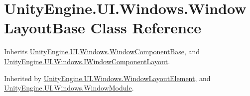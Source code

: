 \hypertarget{class_unity_engine_1_1_u_i_1_1_windows_1_1_window_layout_base}{}\section{Unity\+Engine.\+U\+I.\+Windows.\+Window\+Layout\+Base Class Reference}
\label{class_unity_engine_1_1_u_i_1_1_windows_1_1_window_layout_base}


Inherits \hyperlink{class_unity_engine_1_1_u_i_1_1_windows_1_1_window_component_base}{Unity\+Engine.\+U\+I.\+Windows.\+Window\+Component\+Base}, and \hyperlink{interface_unity_engine_1_1_u_i_1_1_windows_1_1_i_window_component_layout}{Unity\+Engine.\+U\+I.\+Windows.\+I\+Window\+Component\+Layout}.



Inherited by \hyperlink{class_unity_engine_1_1_u_i_1_1_windows_1_1_window_layout_element}{Unity\+Engine.\+U\+I.\+Windows.\+Window\+Layout\+Element}, and \hyperlink{class_unity_engine_1_1_u_i_1_1_windows_1_1_window_module}{Unity\+Engine.\+U\+I.\+Windows.\+Window\+Module}.

